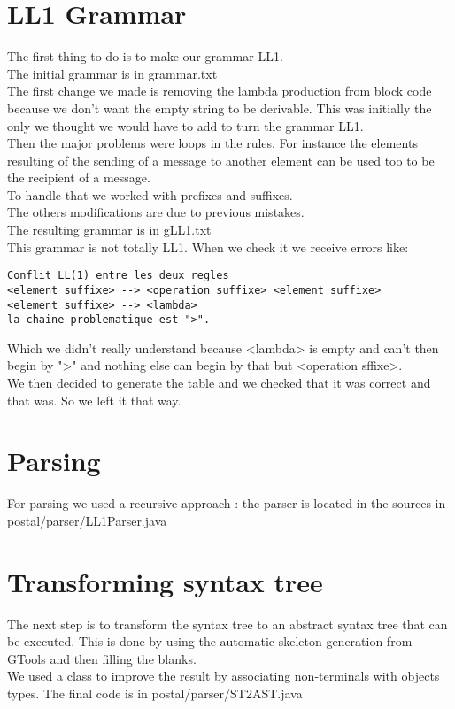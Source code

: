 \documentclass{eplDoc}
\begin{document}
\maketitle
\newpage

\section{LL1 Grammar}
The first thing to do is to make our grammar LL1. \\
The initial grammar is in grammar.txt\\
The first change we made is removing the lambda production from block code because we don't want the empty string to be derivable.  This was initially the only we thought we would have to add to turn the grammar LL1.
\\
Then the major problems were loops in the rules. For instance the elements resulting of the sending of a message to another element can be used too to be the recipient of a message. \\
To handle that we worked with prefixes and suffixes.\\
The others modifications are due to previous mistakes.\\
The resulting grammar is in gLL1.txt\\
This grammar is not totally LL1.  When we check it we receive errors like:
\begin{lstlisting}
Conflit LL(1) entre les deux regles 
<element suffixe> --> <operation suffixe> <element suffixe> 
<element suffixe> --> <lambda>
la chaine problematique est ">".
\end{lstlisting}
Which we didn't really understand because <lambda> is empty and can't then begin by ">" and nothing else can begin by that but <operation sffixe>.\\
We then decided to generate the table and we checked that it was correct and that was. So we left it that way.


\section{Parsing}

For parsing we used a recursive approach : 
the parser is located in the sources in postal/parser/LL1Parser.java

\section{Transforming syntax tree}
The next step is to transform the syntax tree to an abstract syntax tree that can be executed.
This is done by using the automatic skeleton generation from GTools and then filling the blanks.\\
We used a class to improve the result by associating non-terminals with objects types.
The final code is in postal/parser/ST2AST.java
\end{document}
